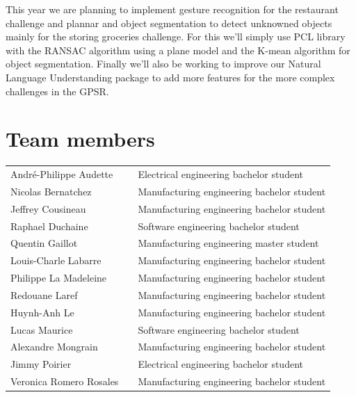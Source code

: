 \documentclass[runningheads,a4paper]{llncs}
\begin{document}
This year we are planning to implement gesture recognition for the restaurant challenge and plannar and object segmentation to detect unknowned objects mainly for the storing groceries challenge. For this we'll simply use PCL library with the RANSAC algorithm using a plane model and the K-mean algorithm for object segmentation. Finally we'll also be working to improve our Natural Language Understanding package to add more features for the more complex challenges in the GPSR. \\ 






	
\section*{Team members}

\begin{tabular}{lll}
   
André-Philippe Audette &    & 	Electrical engineering bachelor student \\
Nicolas Bernatchez &    & 		Manufacturing engineering bachelor student \\
Jeffrey Cousineau &    & 		Manufacturing engineering bachelor student \\
Raphael Duchaine &    & 		Software engineering bachelor student \\
Quentin Gaillot &    & 			Manufacturing engineering master student \\
Louis-Charle Labarre &    & 	Manufacturing engineering bachelor student \\ 
Philippe La Madeleine &    & 	Manufacturing engineering bachelor student \\ 
Redouane Laref &    & 			Manufacturing engineering bachelor student \\
Huynh-Anh Le &    & 			Manufacturing engineering bachelor student \\
Lucas Maurice &    & 			Software engineering bachelor student \\
Alexandre Mongrain  &    & 		Manufacturing engineering bachelor student \\
Jimmy Poirier &    & 			Electrical engineering bachelor student \\
Veronica Romero Rosales  &   & Manufacturing engineering bachelor student \\

\end{tabular}
\end{document}
